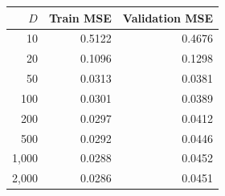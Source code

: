 \begin{tabular}{rrr}
\toprule
$D$ & Train MSE & Validation MSE \\
\midrule
10 & 0.5122 & 0.4676 \\
20 & 0.1096 & 0.1298 \\
50 & 0.0313 & 0.0381 \\
100 & 0.0301 & 0.0389 \\
200 & 0.0297 & 0.0412 \\
500 & 0.0292 & 0.0446 \\
1,000 & 0.0288 & 0.0452 \\
2,000 & 0.0286 & 0.0451 \\
\bottomrule
\end{tabular}
